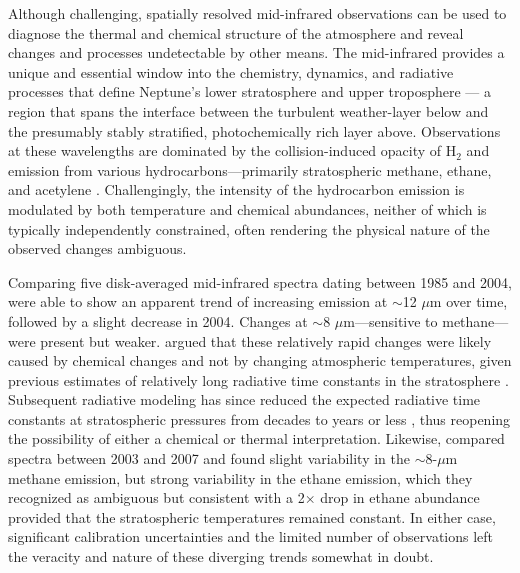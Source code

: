 \documentclass[twocolumn,10pt]{aastex631}
\begin{document}
Although challenging, spatially resolved mid-infrared observations can be used to diagnose the thermal and chemical structure of the atmosphere and reveal changes and processes undetectable by other means. The mid-infrared provides a unique and essential window into the chemistry, dynamics, and radiative processes that define Neptune's lower stratosphere and upper troposphere --- a region that spans the interface between the turbulent weather-layer below and the presumably stably stratified, photochemically rich layer above.  Observations at these wavelengths are dominated by the collision-induced opacity of H$_2$ and emission from various hydrocarbons---primarily stratospheric methane, ethane, and acetylene \citep[\textit{e.g.},][]{moses2020icegiantchem}. Challengingly, the intensity of the hydrocarbon emission is modulated by both temperature and chemical abundances, neither of which is typically independently constrained, often rendering the physical nature of the observed changes ambiguous. 

Comparing five disk-averaged mid-infrared spectra dating between 1985 and 2004, \citet{hammel2006mid} were able to show an apparent trend of increasing emission at $\sim$12 $\mu$m over time, followed by a slight decrease in 2004. Changes at $\sim$8 $\mu$m---sensitive to methane---were present but weaker. \citet{hammel2006mid} argued that these relatively rapid changes were likely caused by chemical changes and not by changing atmospheric temperatures, given previous estimates of relatively long radiative time constants in the stratosphere \citep{conrath1998thermal}. Subsequent radiative modeling has since reduced the expected radiative time constants at stratospheric pressures from decades to years or less \citep{li2018high}, thus reopening the possibility of either a chemical or thermal interpretation. Likewise, \citet{fletcher2014neptune} compared spectra between 2003 and 2007 and found slight variability in the $\sim$8-$\mu$m methane emission, but strong variability in the ethane emission, which they recognized as ambiguous but consistent with a 2$\times$ drop in ethane abundance provided that the stratospheric temperatures remained constant. In either case, significant calibration uncertainties and the limited number of observations left the veracity and nature of these diverging trends somewhat in doubt. 
\end{document}
